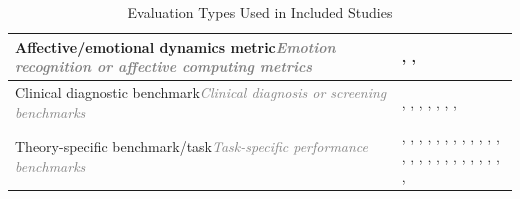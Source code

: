 \begin{table}[tbp]
\begin{tabular}{p{6cm}p{8cm}}
\midrule
Affective/emotional dynamics metric\newline\textcolor{gray}{\footnotesize{\textit{Emotion recognition or affective computing metrics}}} & \cite{Haydarov2025Towards}, \cite{Schmidmaier2025UsingNonverbal}, \cite{Wang2025Feel} \\
\midrule
Clinical diagnostic benchmark\newline\textcolor{gray}{\footnotesize{\textit{Clinical diagnosis or screening benchmarks}}} & \cite{Qiu2025EmoAgent}, \cite{Hu2024PsycoLLM}, \cite{Fouda2026PsychiatryBench}, \cite{Cai2026Exploring}, \cite{Ozgun2025Trustworthy}, \cite{Liu2025Eeyore}, \cite{Chen2023LLM-empowered}, \cite{Schmidgall2025AgentClinic} \\
\midrule
Theory-specific benchmark/task\newline\textcolor{gray}{\footnotesize{\textit{Task-specific performance benchmarks}}} & \cite{Qiu2025EmoAgent}, \cite{Aghakhani2025From}, \cite{Wang2025CARE-Bench}, \cite{Sungarda2025GenAI}, \cite{Chiu2024A}, \cite{Hu2024PsycoLLM}, \cite{Fouda2026PsychiatryBench}, \cite{Nguyen2025Do}, \cite{Zhang2025CBT-BENCH}, \cite{Kim2025KMI}, \cite{Jaiswal2024Building}, \cite{Xu2025MentalChat16K}, \cite{Ozgun2025Trustworthy}, \cite{Wang2024PATIENT}, \cite{Lee2024CACTUS}, \cite{Kermani2025Systematic}, \cite{Feng2025Reframe}, \cite{Kim2025Can}, \cite{Liu2025Eeyore}, \cite{Wang2025Feel}, \cite{Samuel2025PersonaGym}, \cite{Na2024CBT-LLM}, \cite{Sharma2023Cognitive}, \cite{Kang2024Can}, \cite{Chen2023LLM-empowered}, \cite{Tanana2019Development} \\
\bottomrule
\end{tabular}
\caption{Evaluation Types Used in Included Studies}
\label{tab:eval-types}
\end{table}
